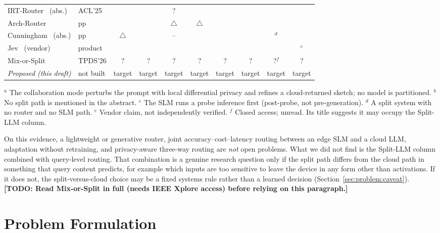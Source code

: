 \documentclass[lettersize,journal]{IEEEtran}
\newcommand{\cmark}{\ding{51}}
\newcommand{\xmark}{\ding{55}}
\newcommand{\pmark}{$\triangle$}
\newcommand{\todo}[1]{\textbf{[TODO: #1]}}
\begin{document}
\begin{table}[t]
\begin{tabular}{llcccccccc}
IRT-Router~\cite{song2025irt} (abs.) & ACL'25 & \xmark & \cmark & ? & \xmark & \xmark & \xmark & \xmark & \xmark \\
Arch-Router~\cite{tran2025arch} & pp & \xmark & \cmark & \pmark & \pmark & \xmark & \xmark & \xmark & \xmark \\
Cunningham~\cite{cunningham2026privacy} (abs.) & pp & \pmark & \xmark & -- & \cmark & \cmark & \cmark & \cmark$^d$ & \xmark \\
Jev~\cite{almeida2026jev} (vendor) & product & \xmark & \cmark & \xmark & \cmark & \xmark & \xmark & \xmark & \cmark$^e$ \\
Mix-or-Split~\cite{wang2026mix} & TPDS'26 & ? & ? & ? & ? & ? & ? & ?$^f$ & ? \\
\hline
\textit{Proposed (this draft)} & not built & target & target & target & target & target & target & target & target \\
\hline
\end{tabular}

\vspace{2pt}
\footnotesize{$^a$ The collaboration mode perturbs the prompt with local
differential privacy and refines a cloud-returned sketch; no model is
partitioned. $^b$ No split path is mentioned in the abstract. $^c$ The SLM runs a
probe inference first (post-probe, not pre-generation). $^d$ A split system with
no router and no SLM path. $^e$ Vendor claim, not independently verified.
$^f$ Closed access; unread. Its title suggests it may occupy the Split-LLM column.}
\end{table}

On this evidence, a lightweight or generative router, joint accuracy--cost--latency
routing between an edge SLM and a cloud LLM, adaptation without retraining, and
privacy-aware three-way routing are \emph{not} open problems. What we did not
find is the Split-LLM column combined with query-level routing. That combination
is a genuine research question only if the split path differs from the cloud path
in something that query content predicts, for example which inputs are too
sensitive to leave the device in any form other than activations. If it does
not, the split-versus-cloud choice may be a fixed systems rule rather than a
learned decision (Section~\ref{sec:problem:caveat}). \todo{Read Mix-or-Split
\cite{wang2026mix} in full (needs IEEE Xplore access) before relying on this
paragraph.}

\section{Problem Formulation}
\label{sec:problem}
\end{document}
